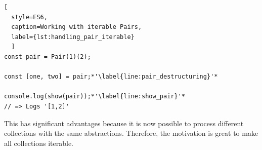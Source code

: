 \begin{lstlisting}[
  style=ES6, 
  caption=Working with iterable Pairs,
  label={lst:handling_pair_iterable}
  ]
const pair = Pair(1)(2);

const [one, two] = pair;*'\label{line:pair_destructuring}'*

console.log(show(pair));*'\label{line:show_pair}'*
// => Logs '[1,2]'
\end{lstlisting}

This has significant advantages because it is now possible to process different 
collections with the same abstractions. Therefore, the motivation is great to 
make all collections iterable.

